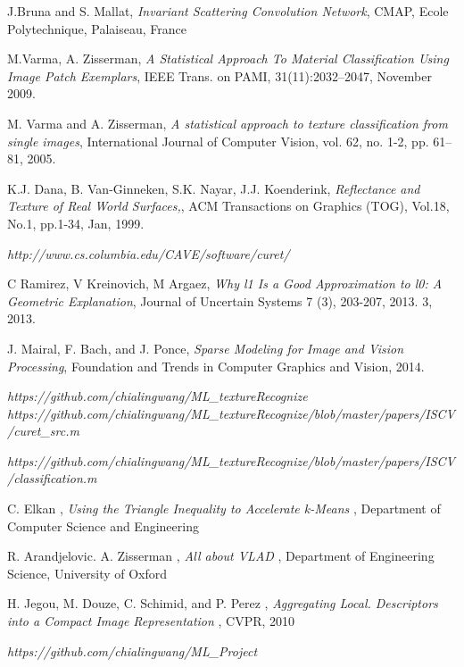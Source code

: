 \documentclass[final,leqno,onefignum,onetabnum]{siamltexmm}
\begin{document}
\begin{thebibliography}{1}

 {\sc J.Bruna and S. Mallat}, {\em Invariant Scattering Convolution Network}, CMAP, Ecole Polytechnique, Palaiseau, France


 {\sc M.Varma, A. Zisserman}, {\em A Statistical Approach To Material Classification Using Image Patch Exemplars}, IEEE Trans. on
PAMI, 31(11):2032–2047, November 2009.

 {\sc M. Varma and A. Zisserman}, {\em A statistical approach to texture classification from single images}, International Journal of Computer Vision, vol. 62, no. 1-2, pp. 61–81,
2005.

 {\sc K.J. Dana, B. Van-Ginneken, S.K. Nayar, J.J. Koenderink}, {\em Reflectance and Texture of Real World Surfaces,}, ACM Transactions on Graphics (TOG),
Vol.18, No.1, pp.1-34, Jan, 1999.

 {\em http://www.cs.columbia.edu/CAVE/software/curet/}


 {\sc C Ramirez, V Kreinovich, M Argaez}, {\em  Why l1 Is a Good Approximation to l0: A Geometric Explanation}, Journal of Uncertain Systems 7 (3), 203-207, 2013. 3, 2013.


 {\sc J. Mairal, F. Bach, and J. Ponce}, {\em  Sparse Modeling for Image and Vision Processing}, Foundation and Trends in Computer Graphics and Vision, 2014.

 {\em https://github.com/chialingwang/ML\_textureRecognize}
 {\em https://github.com/chialingwang/ML\_textureRecognize/blob/master/papers/ISCV/curet\_src.m}

 {\em https://github.com/chialingwang/ML\_textureRecognize/blob/master/papers/ISCV/classification.m}

 {\sc C. Elkan } , {\em Using the Triangle Inequality to Accelerate k-Means} , Department of Computer Science and Engineering

 {\sc R. Arandjelovic. A. Zisserman } , {\em All about VLAD} , Department of Engineering Science, University of Oxford

 {\sc H. Jegou, M. Douze, C. Schimid, and P. Perez } , {\em Aggregating Local. Descriptors into a Compact Image Representation} , CVPR, 2010

 {\em https://github.com/chialingwang/ML\_Project}

\end{thebibliography}
\end{document}
